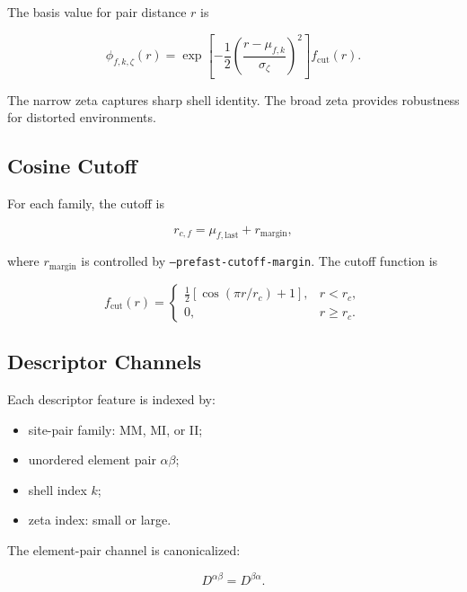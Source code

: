 \documentclass[11pt]{article}
\begin{document}
The basis value for pair distance $r$ is

\begin{equation}
  \phi_{f,k,\zeta}(r)
  =
  \exp\left[
    -\frac{1}{2}
    \left(\frac{r-\mu_{f,k}}{\sigma_{\zeta}}\right)^2
  \right]
  f_{\mathrm{cut}}(r).
\end{equation}

The narrow zeta captures sharp shell identity.
The broad zeta provides robustness for distorted environments.

\subsection{Cosine Cutoff}

For each family, the cutoff is

\begin{equation}
  r_{c,f} = \mu_{f,\mathrm{last}} + r_{\mathrm{margin}},
\end{equation}

where $r_{\mathrm{margin}}$ is controlled by \texttt{--prefast-cutoff-margin}.
The cutoff function is

\begin{equation}
  f_{\mathrm{cut}}(r)
  =
  \begin{cases}
  \frac{1}{2}\left[\cos\left(\pi r/r_c\right)+1\right], & r < r_c,\\
  0, & r \ge r_c.
  \end{cases}
\end{equation}

\subsection{Descriptor Channels}

Each descriptor feature is indexed by:

\begin{itemize}
  \item site-pair family: MM, MI, or II;
  \item unordered element pair $\alpha\beta$;
  \item shell index $k$;
  \item zeta index: small or large.
\end{itemize}

The element-pair channel is canonicalized:

\begin{equation}
  D^{\alpha\beta} = D^{\beta\alpha}.
\end{equation}
\end{document}
